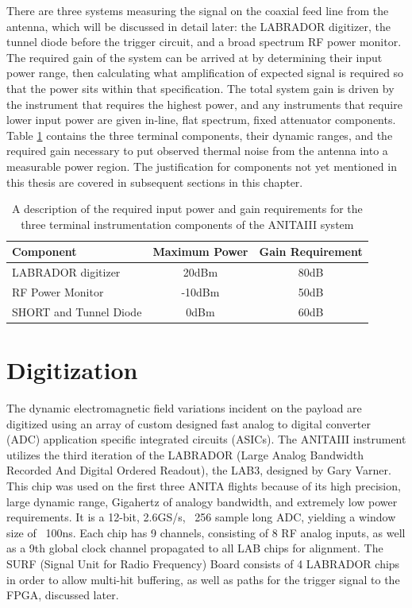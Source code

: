 		There are three systems measuring the signal on the coaxial feed line from the antenna, which will be discussed in detail later: the LABRADOR digitizer, the tunnel diode before the trigger circuit, and a broad spectrum RF power monitor.  The required gain of the system can be arrived at by determining their input power range, then calculating what amplification of expected signal is required so that the power sits within that specification.  The total system gain is driven by the instrument that requires the highest power, and any instruments that require lower input power are given in-line, flat spectrum, fixed attenuator components.  Table \ref{tab:rfLinkBudget} contains the three terminal components, their dynamic ranges, and the required gain necessary to put observed thermal noise from the antenna into a measurable power region.  The justification for components not yet mentioned in this thesis are covered in subsequent sections in this chapter.
	
\begin{table}
	\centering
	\begin{tabular}{| l | c | c |}
		\hline
		Component & Maximum Power & Gain Requirement\\
		\hline
		LABRADOR digitizer & 20dBm & 80dB \\
		RF Power Monitor & -10dBm & 50dB \\
		SHORT and Tunnel Diode & 0dBm & 60dB \\
		\hline
	\end{tabular}
	\caption{A description of the required input power and gain requirements for the three terminal instrumentation components of the ANITAIII system}
	\label{tab:rfLinkBudget}
\end{table}
	


	
\section{Digitization}
	The dynamic electromagnetic field variations incident on the payload are digitized using an array of custom designed fast analog to digital converter (ADC) application specific integrated circuits (ASICs).  The ANITAIII instrument utilizes the third iteration of the LABRADOR (Large Analog Bandwidth Recorded And Digital Ordered Readout), the LAB3, designed by Gary Varner\cite{LABASICPAPER}.  This chip was used on the first three ANITA flights because of its high precision, large dynamic range, Gigahertz of analogy bandwidth, and extremely low power requirements.   It is a 12-bit, 2.6GS/s, ~256 sample long ADC, yielding a window size of ~100ns.  Each chip has 9 channels, consisting of 8 RF analog inputs, as well as a 9th global clock channel propagated to all LAB chips for alignment.  The SURF (Signal Unit for Radio Frequency) Board consists of 4 LABRADOR chips in order to allow multi-hit buffering, as well as paths for the trigger signal to the FPGA, discussed later.

